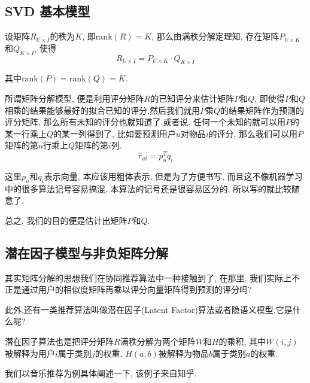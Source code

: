 \documentclass[a4paper,UTF8]{ctexart}
\theoremstyle{plain} \newtheorem{theorem}{定理}[section]
\theoremstyle{plain} \newtheorem{definition}{定义}[section]
\theoremstyle{plain} \newtheorem{lemma}{引理}[section]
\theoremstyle{plain} \newtheorem{proposition}{命题}[section]
\theoremstyle{plain} \newtheorem{example}{例}[section]
\theoremstyle{plain} \newtheorem{remark}{注}[section]
\theoremstyle{plain} \newtheorem{corollary}{推论}[section]
\begin{document}
\subsection{SVD 基本模型}
设矩阵$R_{U \times I}$的秩为$K$, 即$\mathrm{rank}(R) = K$, 那么由满秩分解定理知, 存在矩阵$P_{U \times K}$和$Q_{K \times I}$, 使得
\begin{equation*}
R_{U \times I} = P_{U \times K} \cdot Q_{K \times I}
\end{equation*}

其中$\mathrm{rank}(P) = \mathrm{rank}(Q) = K$.

所谓矩阵分解模型, 便是利用评分矩阵$R$的已知评分来估计矩阵$P$和$Q$, 即使得$P$和$Q$相乘的结果能够最好的拟合已知的评分,然后我们就用$P$乘$Q$的结果矩阵作为预测的评分矩阵, 那么所有未知的评分也就知道了.或者说, 任何一个未知的就可以用$P$的某一行乘上$Q$的某一列得到了, 比如要预测用户$u$对物品$i$的评分, 那么我们可以用$P$矩阵的第$u$行乘上$Q$矩阵的第$i$列.
\begin{equation*}
\hat{r}_{ui} = p_{u}^{T} q_{i}
\end{equation*}

这里$p_{u}$和$q_{i}$表示向量, 本应该用粗体表示, 但是为了方便书写, 而且这不像机器学习中的很多算法记号容易搞混, 本算法的记号还是很容易区分的, 所以写的就比较随意了.

总之, 我们的目的便是估计出矩阵$P$和$Q$.

\subsection{潜在因子模型与非负矩阵分解}
其实矩阵分解的思想我们在协同推荐算法中一种接触到了, 在那里, 我们实际上不正是通过用户的相似度矩阵再乘以评分向量矩阵得到预测的评分吗?

此外,还有一类推荐算法叫做潜在因子(Latent Factor)算法或者隐语义模型.它是什么呢?

潜在因子算法也是把评分矩阵$R$满秩分解为两个矩阵$W$和$H$的乘积, 其中$W(i,j)$被解释为用户$i$属于类别$j$的权重, $H(a, b)$被解释为物品$b$属于类别$a$的权重.

我们以音乐推荐为例具体阐述一下, 该例子来自知乎.
\end{document}
